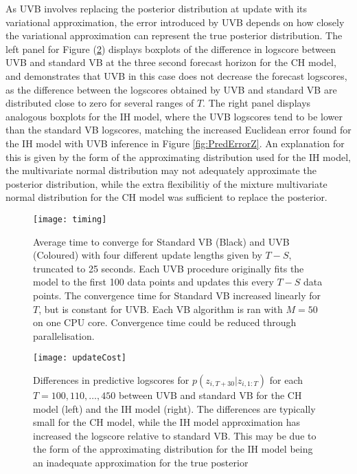 \documentclass[12pt,a4paper]{article}\usepackage[]{graphicx}\usepackage[]{color}
\begin{document}
{As UVB involves replacing the posterior distribution at update with its variational approximation, the error introduced by UVB depends on how closely the variational approximation can represent the true posterior distribution. The left panel for Figure (\ref{fig:updateCost}) displays boxplots of the difference in logscore between UVB and standard VB at the three second forecast horizon for the CH model, and demonstrates that UVB in this case does not decrease the forecast logscores, as the difference between the logscores obtained by UVB and standard VB are distributed close to zero for several ranges of $T$. The right panel displays analogous boxplots for the IH model, where the UVB logscores tend to be lower than the standard VB logscores, matching the increased Euclidean error found for the IH model with UVB inference in Figure \ref{fig:PredErrorZ}. An explanation for this is given by the form of the approximating distribution used for the IH model, the multivariate normal distribution may not adequately approximate the posterior distribution, while the extra flexibilitiy of the mixture multivariate normal distribution for the CH model was sufficient to replace the posterior.

\begin{figure}[htp]
\centering
\texttt{[image: timing]}
\caption{Average time to converge for Standard VB (Black) and UVB (Coloured) with four different update lengths given by $T - S$, truncated to 25 seconds. Each UVB procedure originally fits the model to the first 100 data points and updates this every $T - S$ data points. The convergence time for Standard VB increased linearly for $T$, but is constant for UVB. Each VB algorithm is ran with $M = 50$ on one CPU core. Convergence time could be reduced through parallelisation.}
\label{fig:timing}
\end{figure}
\begin{figure}[htp]
\centering
\texttt{[image: updateCost]}
\caption{Differences in predictive logscores for $p(z_{i, T+30} | z_{i, 1:T})$ for each $T = 100, 110, \dots, 450$ between UVB and standard VB for the CH model (left) and the IH model (right). The differences are typically small for the CH model, while the IH model approximation has increased the logscore relative to standard VB. This may be due to the form of the approximating distribution for the IH model being an inadequate approximation for the true posterior}
\label{fig:updateCost}
\end{figure}


}
\end{document}
